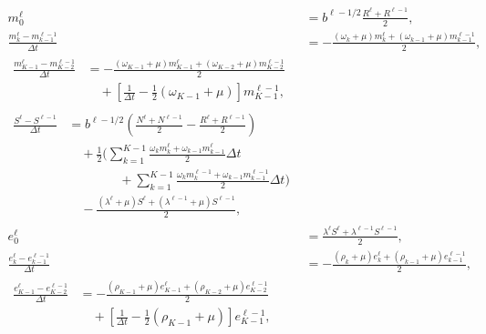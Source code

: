 \documentclass{jpmarticle}
\let\subequationsorig\subequations%
\let\endsubequationsorig\endsubequations%
\renewenvironment{subequations}{
  \subequationsorig
  \renewcommand{\theequation}{\theparentequation.\arabic{equation}}
}{
  \endsubequationsorig
}
\begin{document}
\begin{subequations}
  \begin{align}
    m_0^{\ell} &=
    b^{\ell - 1 / 2} \frac{R^{\ell} + R^{\ell - 1}}{2},
    \\
    \frac{m_k^{\ell} - m_{k - 1}^{\ell - 1}}{\Delta t} &=
    - \frac{(\omega_k + \mu) m_k^{\ell}
      + (\omega_{k - 1} + \mu) m_{k - 1}^{\ell - 1}}{2},
    \\
    \begin{split}
      \frac{m_{K - 1}^{\ell} - m_{K - 2}^{\ell - 1}}{\Delta t} &=
      - \frac{(\omega_{K - 1} + \mu) m_{K - 1}^{\ell}
        + (\omega_{K - 2} + \mu) m_{K - 2}^{\ell - 1}}{2}
      \\ & \quad {}
      + \left[\frac{1}{\Delta t}
        - \frac{1}{2} (\omega_{K - 1} + \mu)\right]
      m_{K - 1}^{\ell - 1},
    \end{split}
    \\
    \begin{split}
      \frac{S^{\ell} - S^{\ell - 1}}{\Delta t} &=
      b^{\ell - 1 / 2} \left(\frac{N^{\ell} + N^{\ell - 1}}{2}
        - \frac{R^{\ell} + R^{\ell - 1}}{2}\right)
      \\ & \quad {}
      + \frac{1}{2} \Bigg(
      \sum_{k = 1}^{K - 1}
      \frac{\omega_k m_k^{\ell} + \omega_{k - 1} m_{k - 1}^{\ell}}{2}
      \Delta t
      \\ & \quad\quad\quad\quad {}
      + \sum_{k = 1}^{K - 1}
      \frac{\omega_k m_k^{\ell - 1} + \omega_{k - 1} m_{k - 1}^{\ell - 1}}{2}
      \Delta t
      \Bigg)
      \\ & \quad {}
      - \frac{(\lambda^{\ell} + \mu) S^{\ell}
        + (\lambda^{\ell - 1} + \mu) S^{\ell - 1}}{2},
    \end{split}
    \\
    e_0^{\ell} &=
    \frac{\lambda^{\ell} S^{\ell} + \lambda^{\ell - 1} S^{\ell - 1}}{2},
    \\
    \frac{e_k^{\ell} - e_{k - 1}^{\ell - 1}}{\Delta t} &=
    - \frac{(\rho_k + \mu) e_k^{\ell}
      + (\rho_{k - 1} + \mu) e_{k - 1}^{\ell - 1}}{2},
    \\
    \begin{split}
      \frac{e_{K - 1}^{\ell} - e_{K - 2}^{\ell - 1}}{\Delta t} &=
      - \frac{(\rho_{K - 1} + \mu) e_{K - 1}^{\ell}
        + (\rho_{K - 2} + \mu) e_{K - 2}^{\ell - 1}}{2}
      \\ & \quad {}
      + \left[\frac{1}{\Delta t}
        - \frac{1}{2} (\rho_{K - 1} + \mu)\right]
      e_{K - 1}^{\ell - 1},
    \end{split}

\end{align}
\end{subequations}
\end{document}
